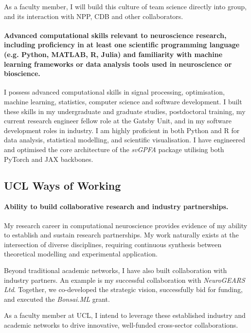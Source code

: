 \documentclass{article}
\begin{document}
As a faculty member, I will build this culture of team science directly into
group, and its interaction with NPP, CDB and other collaborators.

\paragraph{Advanced computational skills relevant to neuroscience research,
including proﬁciency in at least one scientiﬁc programming language (e.g.
Python, MATLAB, R, Julia) and familiarity with machine learning frameworks or
data analysis tools used in neuroscience or bioscience.}

I possess advanced computational skills in signal processing, optimisation,
machine learning, statistics, computer science and software development. I
built these skills in my undergraduate and graduate studies, postdoctoral
training, my current research engineer fellow role at the Gatsby Unit, and in
my software development roles in industry.
%
I am highly proficient in both Python and R for data analysis, statistical
modelling, and scientific visualisation.  I have engineered and optimised the
core architecture of the \textit{svGPFA} package utilising both PyTorch and JAX
backbones.

\subsection*{UCL Ways of Working}

\paragraph{Ability to build collaborative research and industry partnerships.}

My research career in computational neuroscience provides evidence of my
ability to establish and sustain research partnerships. My work naturally
exists at the intersection of diverse disciplines, requiring continuous
synthesis between theoretical modelling and experimental application.

Beyond traditional academic networks, I have also built collaboration with
industry partners. An example is my successful collaboration with
\textit{NeuroGEARS Ltd}. Together, we co-developed the strategic vision,
successfully bid for funding, and executed the \textit{Bonsai.ML} grant.

As a faculty member at UCL, I intend to leverage these established industry and
academic networks to drive innovative, well-funded cross-sector collaborations.
\end{document}
